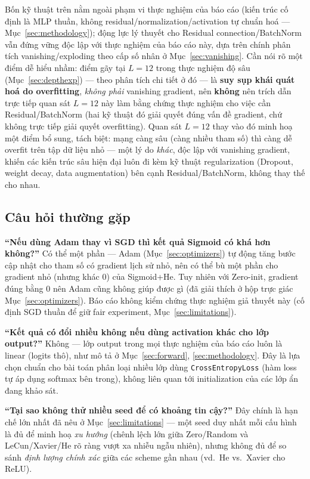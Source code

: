 \documentclass[12pt,a4paper]{report}
\begin{document}
Bốn kỹ thuật trên nằm ngoài phạm vi thực nghiệm của báo cáo (kiến trúc cố
định là MLP thuần, không residual/normalization/activation tự chuẩn hoá
--- Mục~\ref{sec:methodology}); động lực lý thuyết cho Residual
connection/BatchNorm vẫn đứng vững độc lập với thực nghiệm của báo cáo
này, dựa trên chính phân tích vanishing/exploding theo cấp số nhân ở
Mục~\ref{sec:vanishing}. Cần nói rõ một điểm dễ hiểu nhầm: điểm gãy tại
$L{=}12$ trong thực nghiệm độ sâu (Mục~\ref{sec:depthexp}) --- theo phân
tích chi tiết ở đó --- là \textbf{suy sụp khái quát hoá do overfitting},
\emph{không phải} vanishing gradient, nên \textbf{không} nên trích dẫn
trực tiếp quan sát $L{=}12$ này làm bằng chứng thực nghiệm cho việc cần
Residual/BatchNorm (hai kỹ thuật đó giải quyết đúng vấn đề gradient, chứ
không trực tiếp giải quyết overfitting). Quan sát $L{=}12$ thay vào đó
minh hoạ một điểm bổ sung, tách biệt: mạng càng sâu (càng nhiều tham số)
thì càng dễ overfit trên tập dữ liệu nhỏ --- một lý do \emph{khác}, độc
lập với vanishing gradient, khiến các kiến trúc sâu hiện đại luôn đi kèm
kỹ thuật regularization (Dropout, weight decay, data augmentation) bên
cạnh Residual/BatchNorm, không thay thế cho nhau.

\subsection{Câu hỏi thường gặp}

\textbf{``Nếu dùng Adam thay vì SGD thì kết quả Sigmoid có khá hơn
không?''} Có thể một phần --- Adam (Mục~\ref{sec:optimizers}) tự động
tăng bước cập nhật cho tham số có gradient lịch sử nhỏ, nên có thể bù một
phần cho gradient nhỏ (nhưng khác $0$) của Sigmoid+He. Tuy nhiên với
Zero-init, gradient đúng bằng $0$ nên Adam cũng không giúp được gì (đã
giải thích ở hộp trực giác Mục~\ref{sec:optimizers}). Báo cáo không kiểm
chứng thực nghiệm giả thuyết này (cố định SGD thuần để giữ fair
experiment, Mục~\ref{sec:limitations}).

\textbf{``Kết quả có đổi nhiều không nếu dùng activation khác cho lớp
output?''} Không --- lớp output trong mọi thực nghiệm của báo cáo luôn là
linear (logits thô), như mô tả ở Mục~\ref{sec:forward},
\ref{sec:methodology}. Đây là lựa chọn chuẩn cho bài toán phân loại nhiều
lớp dùng \texttt{CrossEntropyLoss} (hàm loss tự áp dụng softmax bên
trong), không liên quan tới initialization của các lớp ẩn đang khảo sát.

\textbf{``Tại sao không thử nhiều seed để có khoảng tin cậy?''} Đây chính
là hạn chế lớn nhất đã nêu ở Mục~\ref{sec:limitations} --- một seed duy
nhất mỗi cấu hình là đủ để minh hoạ \emph{xu hướng} (chênh lệch lớn giữa
Zero/Random và LeCun/Xavier/He rõ ràng vượt xa nhiễu ngẫu nhiên), nhưng
không đủ để so sánh \emph{định lượng chính xác} giữa các scheme gần nhau
(vd.\ He vs.\ Xavier cho ReLU).
\end{document}
